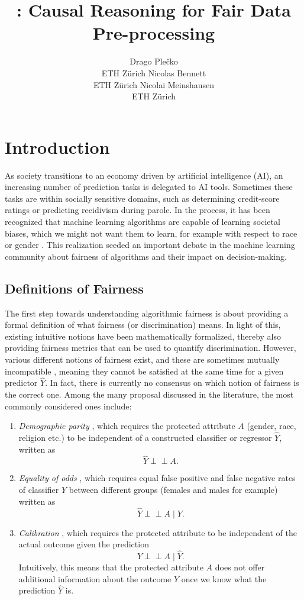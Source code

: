 \documentclass[
  nojss]{jss}
\author{
Drago Plečko\\ETH Zürich \And Nicolas Bennett\\ETH Zürich \And Nicolai Meinshausen\\ETH Zürich
}
\title{\pkg{fairadapt}: Causal Reasoning for Fair Data Pre-processing}
\providecommand{\tightlist}{%
  \setlength{\itemsep}{0pt}\setlength{\parskip}{0pt}}
\begin{document}
\hypertarget{introduction}{%
\section{Introduction}\label{introduction}}

As society transitions to an economy driven by artificial intelligence
(AI), an increasing number of prediction tasks is delegated to AI tools.
Sometimes these tasks are within socially sensitive domains, such as
determining credit-score ratings or predicting recidivism during parole.
In the process, it has been recognized that machine learning algorithms
are capable of learning societal biases, which we might not want them to
learn, for example with respect to race \citep{larson2016recidivism} or
gender \citep{lambrecht2019algorithmic, blau2003pay}. This realization
seeded an important debate in the machine learning community about
fairness of algorithms and their impact on decision-making.

\hypertarget{definitions-of-fairness}{%
\subsection{Definitions of Fairness}\label{definitions-of-fairness}}

The first step towards understanding algorithmic fairness is about
providing a formal definition of what fairness (or discrimination)
means. In light of this, existing intuitive notions have been
mathematically formalized, thereby also providing fairness metrics that
can be used to quantify discrimination. However, various different
notions of fairness exist, and these are sometimes mutually incompatible
\citep{corbett2018measure}, meaning they cannot be satisfied at the same
time for a given predictor \(\widehat{Y}\). In fact, there is currently
no consensus on which notion of fairness is the correct one. Among the
many proposal discussed in the literature, the most commonly considered
ones include:

\begin{enumerate}
\def\labelenumi{(\arabic{enumi})}
\tightlist
\item
  \emph{Demographic parity} \citep{darlington1971fairness}, which
  requires the protected attribute \(A\) (gender, race, religion etc.)
  to be independent of a constructed classifier or regressor
  \(\widehat{Y}\), written as \[\widehat{Y} {\perp\!\!\!\perp}A.\]
\item
  \emph{Equality of odds} \citep{hardt2016eosl}, which requires equal
  false positive and false negative rates of classifier \(\widehat{Y}\)
  between different groups (females and males for example) written as
  \[\widehat{Y} {\perp\!\!\!\perp}A \mid Y.\]
\item
  \emph{Calibration} \citep{chouldechova2017fair}, which requires the
  protected attribute to be independent of the actual outcome given the
  prediction \[Y {\perp\!\!\!\perp}A \mid \widehat{Y}.\] Intuitively,
  this means that the protected attribute \(A\) does not offer
  additional information about the outcome \(Y\) once we know what the
  prediction \(\widehat{Y}\) is.
\end{enumerate}
\end{document}
